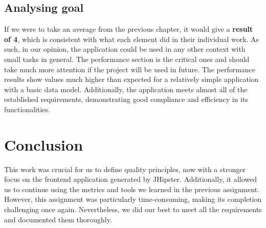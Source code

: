 \documentclass[a4paper,11pt,openright,BCOR=15mm]{scrbook}
\begin{document}
	\section{Analysing goal}
	
	If we were to take an average from the previous chapter, it would give a \textbf{result of 4}, which is consistent with what each element did in their individual work.
	As such, in our opinion, the application could be used in any other context with small tasks in general. The performance section is the critical ones and should take much more attention if the project will be used in future. The performance results show values much higher than expected for a relatively simple application with a basic data model. Additionally, the application meets almost all of the established requirements, demonstrating good compliance and efficiency in its functionalities.
	
	\chapter{Conclusion}
	
	This work was crucial for us to define quality principles, now with a stronger focus on the frontend application generated by JHipster. Additionally, it allowed us to continue using the metrics and tools we learned in the previous assignment. However, this assignment was particularly time-consuming, making its completion challenging once again. Nevertheless, we did our best to meet all the requirements and documented them thoroughly.


	
	
	\renewcommand\bibname{References}
	
	\label{references}
	
\end{document}
